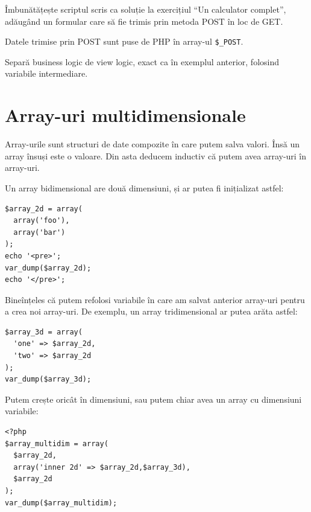
\begin{Exercise}[title={View Logic și Business Logic},difficulty=1]
Îmbunătățește scriptul scris ca soluție la exercițiul ``Un calculator complet'',
adăugând un formular care să fie trimis prin metoda POST în loc de GET.

Datele trimise prin POST sunt puse de PHP în array-ul \texttt{\$\_POST}.

Separă business logic de view logic, exact ca în exemplul anterior, folosind
variabile intermediare.
\end{Exercise}



\section{Array-uri multidimensionale}
Array-urile sunt structuri de date compozite în care putem salva valori.
Însă un array însuși este o valoare. Din asta deducem inductiv că
putem avea array-uri în array-uri.

Un array bidimensional are două dimensiuni, și ar putea fi inițializat
astfel:
\begin{lstlisting}
$array_2d = array(
  array('foo'),
  array('bar')
);
echo '<pre>';
var_dump($array_2d);
echo '</pre>';
\end{lstlisting}
Bineînțeles că putem refolosi variabile în care am salvat anterior array-uri
pentru a crea noi array-uri. De exemplu, un array tridimensional ar putea arăta
astfel:
\begin{lstlisting}
$array_3d = array(
  'one' => $array_2d,
  'two' => $array_2d
);
var_dump($array_3d);
\end{lstlisting}
Putem crește oricât în dimensiuni, sau putem chiar avea un array cu dimensiuni variabile:
\begin{lstlisting}
<?php
$array_multidim = array(
  $array_2d,
  array('inner 2d' => $array_2d,$array_3d),
  $array_2d
);
var_dump($array_multidim);
\end{lstlisting}


